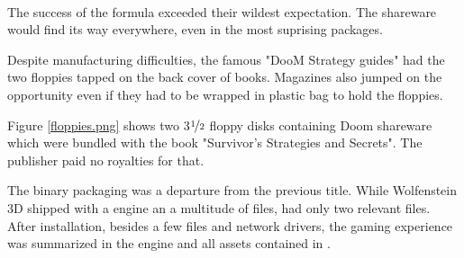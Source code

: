 \par
{}\\
\par

The success of the formula exceeded their wildest expectation. The shareware would find its way everywhere, even in the most suprising packages.\\
\par Despite manufacturing difficulties, the famous "DooM Strategy guides" had the two floppies tapped on the back cover of books. Magazines also jumped on the opportunity even if they had to be wrapped in plastic bag to hold the floppies.




\par
Figure \ref{floppies.png} shows two 3$\nicefrac{1}{2}$ floppy disks containing Doom shareware which were bundled with the book "Survivor's Strategies and Secrets". The publisher paid no royalties for that.\\
\par
The binary packaging was a departure from the previous title. While Wolfenstein 3D shipped with a  engine an a multitude of  files, \doom{}had only two relevant files. After installation, besides a few  files and network drivers, the gaming experience was summarized in the engine  and all assets contained in .\\ 
\par


